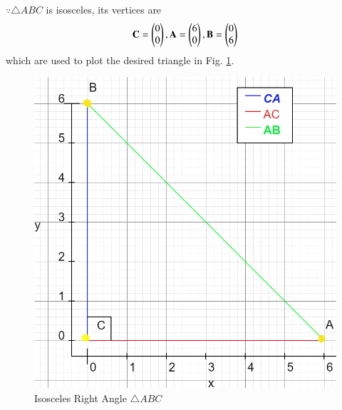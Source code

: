 
$\because \triangle ABC$ is isosceles, its vertices are
\begin{align}
\mathbf{C} = \begin{pmatrix}0\\0\end{pmatrix},
\mathbf{A} = \begin{pmatrix}6\\0\end{pmatrix}, 
\mathbf{B} = \begin{pmatrix}0\\6\end{pmatrix}
\end{align}
which are used to plot the desired triangle in Fig. \ref{constr/26/fig:right_angle_triangle}.	
%
\begin{figure}[!ht]
\centering
\includegraphics[width=\columnwidth]{solutions/26/diagram-1.png}
\caption{Isosceles Right Angle $\triangle ABC$}
\label{constr/26/fig:right_angle_triangle}	
\end{figure}


